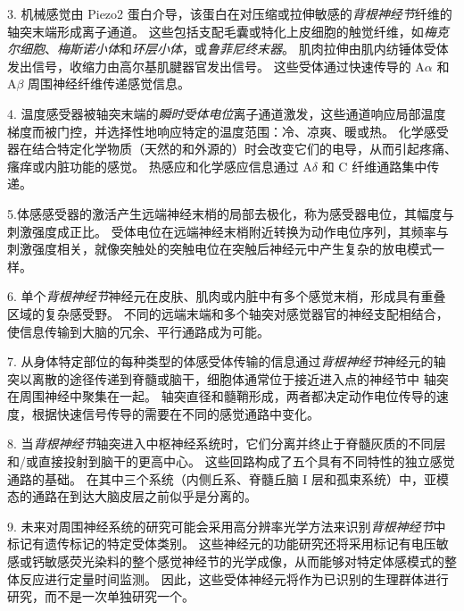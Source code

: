 3. 机械感觉由 Piezo2 蛋白介导，该蛋白在对压缩或拉伸敏感的\textit{背根神经节}纤维的轴突末端形成离子通道。
这些包括支配毛囊或特化上皮细胞的触觉纤维，如\textit{梅克尔细胞}、\textit{梅斯诺小体}和\textit{环层小体}，或\textit{鲁菲尼终末器}。
肌肉拉伸由肌内纺锤体受体发出信号，收缩力由高尔基肌腱器官发出信号。
这些受体通过快速传导的 A$\alpha$ 和 A$\beta$ 周围神经纤维传递感觉信息。


4. 温度感受器被轴突末端的\textit{瞬时受体电位}离子通道激发，这些通道响应局部温度梯度而被门控，并选择性地响应特定的温度范围：冷、凉爽、暖或热。
化学感受器在结合特定化学物质（天然的和外源的）时会改变它们的电导，从而引起疼痛、瘙痒或内脏功能的感觉。
热感应和化学感应信息通过 A$\delta$ 和 C 纤维通路集中传递。 


5.体感感受器的激活产生远端神经末梢的局部去极化，称为感受器电位，其幅度与刺激强度成正比。
受体电位在远端神经末梢附近转换为动作电位序列，其频率与刺激强度相关，就像突触处的突触电位在突触后神经元中产生复杂的放电模式一样。


6. 单个\textit{背根神经节}神经元在皮肤、肌肉或内脏中有多个感觉末梢，形成具有重叠区域的复杂感受野。
不同的远端末端和多个轴突对感觉器官的神经支配相结合，使信息传输到大脑的冗余、平行通路成为可能。 


7. 从身体特定部位的每种类型的体感受体传输的信息通过\textit{背根神经节}神经元的轴突以离散的途径传递到脊髓或脑干，细胞体通常位于接近进入点的神经节中 轴突在周围神经中聚集在一起。
轴突直径和髓鞘形成，两者都决定动作电位传导的速度，根据快速信号传导的需要在不同的感觉通路中变化。


8. 当\textit{背根神经节}轴突进入中枢神经系统时，它们分离并终止于脊髓灰质的不同层和/或直接投射到脑干的更高中心。
这些回路构成了五个具有不同特性的独立感觉通路的基础。
在其中三个系统（内侧丘系、脊髓丘脑 I 层和孤束系统）中，亚模态的通路在到达大脑皮层之前似乎是分离的。


9. 未来对周围神经系统的研究可能会采用高分辨率光学方法来识别\textit{背根神经节}中标记有遗传标记的特定受体类别。
这些神经元的功能研究还将采用标记有电压敏感或钙敏感荧光染料的整个感觉神经节的光学成像，从而能够对特定体感模式的整体反应进行定量时间监测。
因此，这些受体神经元将作为已识别的生理群体进行研究，而不是一次单独研究一个。


